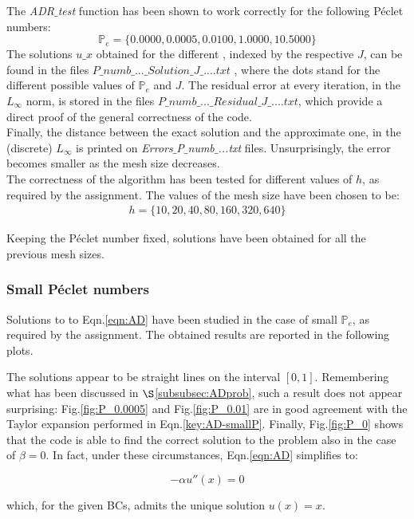 \documentclass[11pt]{article}
\theoremstyle{theorem}
\theoremstyle{definition}
\begin{document}
The \emph{ADR$\_$test} function has been shown to work correctly for the following  P\'{e}clet numbers:
$$\mathbb{P}_e=\lbrace 0.0000, 0.0005, 0.0100, 1.0000, 10.5000 \rbrace$$
The solutions $u\_x$ obtained for the different , indexed by the respective $J$, can be found in the files $P\_numb\_...\_Solution\_J\_....txt$ , where the dots stand for the different possible values of $\mathbb{P}_e$ and $J$. The residual error at every iteration, in the $L_\infty$ norm, is stored in the files $P\_numb\_...\_Residual\_J\_....txt$, which provide a direct proof of the general correctness of the code.\\
Finally, the distance between the exact solution and the approximate one, in the (discrete) $L_\infty$ is printed on \emph{Errors$\_$P$\_$numb$\_$...txt} files. Unsurprisingly, the error becomes smaller as the mesh size decreases.\\
The correctness of the algorithm has been tested for different values of $h$, as required by the assignment. The values of the mesh size have been chosen to be:
\begin{align}
	\label{eqn:h-choice}
	h=\lbrace10, 20, 40, 80, 160, 320, 640\rbrace
\end{align}

Keeping the P\'{e}clet number fixed, solutions have been obtained for all the previous mesh sizes.\\ 


\subsubsection{Small P\'{e}clet numbers}
Solutions to to Eqn.\eqref{eqn:AD} have been studied in the case of small $\mathbb{P}_e$, as required by the assignment. The obtained results are reported in the following plots.


The solutions appear to be straight lines on the interval $[0, 1]$. Remembering what has been discussed in $\S$\ref{subsubsec:ADprob}, such a result does not appear surprising: Fig.\ref{fig:P_0.0005} and Fig.\ref{fig:P_0.01} are in good agreement with the Taylor expansion performed in Eqn.\eqref{key:AD-smallP}. Finally, Fig.\ref{fig:P_0} shows that the code is able to find the correct solution to the problem also in the case of $\beta=0$. In fact, under these circumstances, Eqn.\eqref{eqn:AD} simplifies to:

$$-\alpha u''(x)=0$$

which, for the given BCs, admits the unique solution $u(x)=x$.\\
\end{document}
